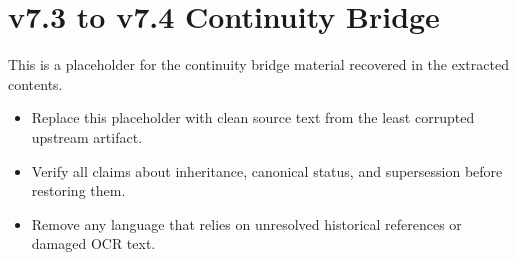 \chapter*{v7.3 to v7.4 Continuity Bridge}

This is a placeholder for the continuity bridge material recovered in the extracted contents.

\begin{itemize}[leftmargin=2em]
\item Replace this placeholder with clean source text from the least corrupted upstream artifact.
\item Verify all claims about inheritance, canonical status, and supersession before restoring them.
\item Remove any language that relies on unresolved historical references or damaged OCR text.
\end{itemize}
